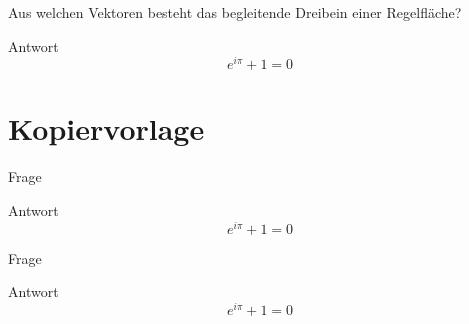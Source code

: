 \documentclass[twocolumn, fontsize=8pt, DIV=1]{scrartcl}
\begin{document}
\begin{framed}
    Aus welchen Vektoren besteht das begleitende Dreibein einer Regelfläche?
\end{framed}
Antwort
\[
    e^{i\pi} + 1 = 0
\]



\section*{Kopiervorlage}

\begin{framed}
    Frage
\end{framed}
Antwort
\[
    e^{i\pi} + 1 = 0
\]



\begin{framed}
    Frage
\end{framed}
Antwort
\[
    e^{i\pi} + 1 = 0
\]



\listoftodos
\end{document}
